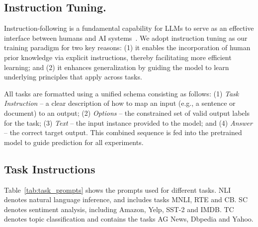 \subsection{Instruction Tuning.} Instruction-following is a fundamental capability for LLMs to serve as an effective interface between humans and AI systems~\cite{wei2021finetuned,ouyang2022training}. We adopt instruction tuning as our training paradigm for two key reasons: (1) it enables the incorporation of human prior knowledge via explicit instructions, thereby facilitating more efficient learning; and (2) it enhances generalization by guiding the model to learn underlying principles that apply across tasks.

All tasks are formatted using a unified schema consisting as follows: (1) \textit{Task Instruction} -- a clear description of how to map an input (e.g., a sentence or document) to an output; (2) \textit{Options} -- the constrained set of valid output labels for the task; (3) \textit{Text} -- the input instance provided to the model; and (4) \textit{Answer} -- the correct target output. This combined sequence is fed into the pretrained model to guide prediction for all experiments.
\subsection{Task Instructions}
Table~\ref{tab:task_prompts} shows the prompts used for different tasks. NLI
denotes natural language inference, and includes tasks
MNLI, RTE and CB. SC denotes sentiment
analysis, including Amazon, Yelp, SST-2 and
IMDB. TC denotes topic classification and contains the tasks
AG News, Dbpedia and Yahoo.

